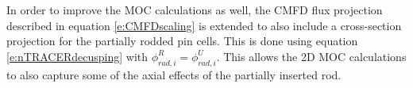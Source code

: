 In order to improve the MOC calculations as well, the CMFD flux projection described in equation \ref{e:CMFDscaling} is extended to also include a cross-section projection for the partially rodded pin cells.  This is done using equation \ref{e:nTRACERdecusping} with $\phi_{rad,i}^R = \phi_{rad,i}^U$.  This allows the 2D MOC calculations to also capture some of the axial effects of the partially inserted rod.


%
